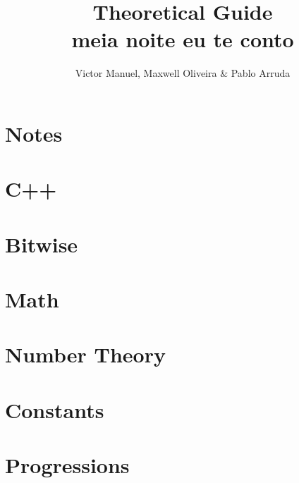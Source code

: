 \documentclass[10pt, twocolumn]{article}
\title{\vspace{-2cm}\textbf{Theoretical Guide\\meia noite eu te conto}}
\author{Victor Manuel, Maxwell Oliveira $\&$ Pablo Arruda}
\affil{\textit{Thanks to UFMG - Humuhumunukunukuapua'a}}
\date{}
\begin{document}
\maketitle\section{Notes}

\section{C++}






\section{Bitwise}


\section{Math}






\section{Number Theory}









\section{Constants}



\section{Progressions}


\end{document}
